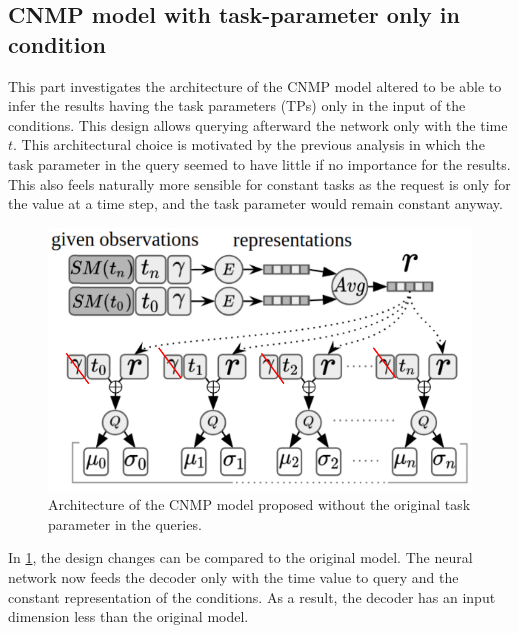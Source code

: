 \subsection{CNMP model with task-parameter only in condition}
This part investigates the architecture of the CNMP model altered to be able to infer the results having the task parameters (TPs) only in the input of the conditions. This design allows querying afterward the network only with the time $t$. 
This architectural choice is motivated by the previous analysis in which the task parameter in the query seemed to have little if no importance for the results. This also feels naturally more sensible for constant tasks as the request is only for the value at a time step, and the task parameter would remain constant anyway. 

\begin{figure}
    \centering
    \includegraphics[width=0.7\linewidth]{figures/CNMP_short_no_tp_query.png}
    \caption{ Architecture of the CNMP model proposed without the original task parameter in the queries. }
    \label{fig:CNMP_short_no_tp_query}
\end{figure}

In \cref{fig:CNMP_short_no_tp_query}, the design changes can be compared to the original model. The neural network now feeds the decoder only with the time value to query and the constant representation of the conditions. As a result, the decoder has an input dimension less than the original model.

